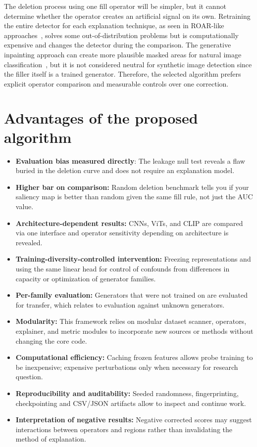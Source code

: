 The deletion process using one fill operator will be simpler, but it
cannot determine whether the operator creates an artificial signal on
its own. Retraining the entire detector for each explanation technique,
as seen in ROAR-like approaches~\cite{hooker2019roar}, solves some out-of-distribution
problems but is computationally expensive and changes the detector
during the comparison. The generative inpainting approach can create
more plausible masked areas for natural image classification~\cite{lindl2026inpainting, aghakishiyeva2025photorealistic}, but it is
not considered neutral for synthetic image detection since the filler
itself is a trained generator. Therefore, the selected algorithm prefers
explicit operator comparison and measurable controls over one
correction.

\section{\texorpdfstring{\textbf{Advantages of the proposed
algorithm}}{Advantages of the proposed algorithm}}\label{advantages-of-the-proposed-algorithm}

\begin{itemize}
\item
  \textbf{Evaluation bias measured directly}: The leakage null test
  reveals a flaw buried in the deletion curve and does not require an
  explanation model.
\item
  \textbf{Higher bar on comparison:} Random deletion benchmark tells you
  if your saliency map is better than random given the same fill rule,
  not just the AUC value.
\item
  \textbf{Architecture-dependent results:} CNNs, ViTs, and CLIP are
  compared via one interface and operator sensitivity depending on
  architecture is revealed.
\item
  \textbf{Training-diversity-controlled intervention:} Freezing
  representations and using the same linear head for control of
  confounds from differences in capacity or optimization of generator
  families.
\item
  \textbf{Per-family evaluation:} Generators that were not trained on
  are evaluated for transfer, which relates to evaluation against
  unknown generators.
\item
  \textbf{Modularity:} This framework relies on modular dataset scanner,
  operators, explainer, and metric modules to incorporate new sources or
  methods without changing the core code.
\item
  \textbf{Computational efficiency:} Caching frozen features allows
  probe training to be inexpensive; expensive perturbations only when
  necessary for research question.
\item
  \textbf{Reproducibility and auditability:} Seeded randomness,
  fingerprinting, checkpointing and CSV/JSON artifacts allow to inspect
  and continue work.
\item
  \textbf{Interpretation of negative results:} Negative corrected scores
  may suggest interactions between operators and regions rather than
  invalidating the method of explanation.
\end{itemize}

